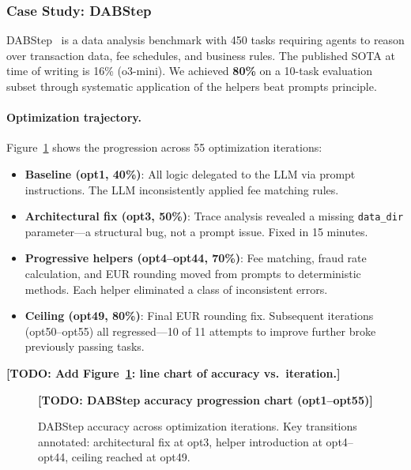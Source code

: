 \documentclass[11pt, logo, onecolumn, copyright, colorlinks=true, allcolors=blue]{nvidiatechreport}
\newcommand{\placeholder}[1]{\textcolor{red!60!black}{\textbf{[TODO: #1]}}}
\begin{document}
\subsubsection{Case Study: DABStep}
\label{sec:optimization:dabstep}

DABStep~\cite{dabstep2025} is a data analysis benchmark with 450 tasks requiring
agents to reason over transaction data, fee schedules, and business rules. The
published SOTA at time of writing is 16\% (o3-mini). We achieved \textbf{80\%}
on a 10-task evaluation subset through systematic application of the helpers
beat prompts principle.

\paragraph{Optimization trajectory.} Figure~\ref{fig:dabstep} shows the
progression across 55 optimization iterations:

\begin{itemize}
  \item \textbf{Baseline (opt1, 40\%)}: All logic delegated to the LLM via
        prompt instructions. The LLM inconsistently applied fee matching rules.
  \item \textbf{Architectural fix (opt3, 50\%)}: Trace analysis revealed a
        missing \texttt{data\_dir} parameter---a structural bug, not a prompt
        issue. Fixed in 15 minutes.
  \item \textbf{Progressive helpers (opt4--opt44, 70\%)}: Fee matching, fraud
        rate calculation, and EUR rounding moved from prompts to deterministic
        methods. Each helper eliminated a class of inconsistent errors.
  \item \textbf{Ceiling (opt49, 80\%)}: Final EUR rounding fix. Subsequent
        iterations (opt50--opt55) all regressed---10 of 11 attempts to improve
        further broke previously passing tasks.
\end{itemize}

\placeholder{Add Figure~\ref{fig:dabstep}: line chart of accuracy vs.\ iteration.}

\begin{figure}[h]
\centering
\placeholder{DABStep accuracy progression chart (opt1--opt55)}
\caption{DABStep accuracy across optimization iterations. Key transitions
annotated: architectural fix at opt3, helper introduction at opt4--opt44,
ceiling reached at opt49.}
\label{fig:dabstep}
\end{figure}
\end{document}
